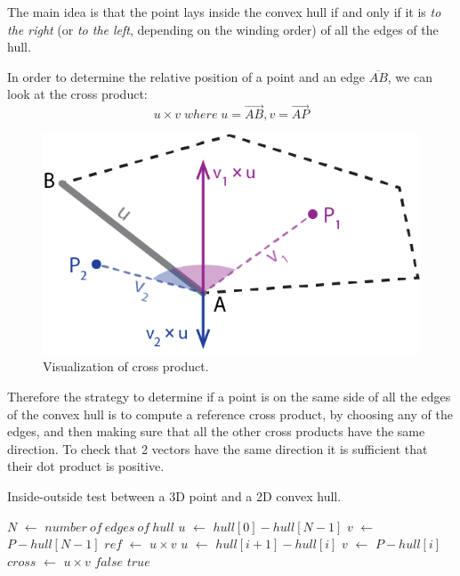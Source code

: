 \documentclass{PoliMi_MasterThesis}
\newcommand*\Let[2]{\State #1 $\gets$ #2}
\begin{document}
The main idea is that the point lays inside the convex hull if and only if it is \textit{to the right} (or \textit{to the left}, depending on the winding order) of all the edges of the hull.

In order to determine the relative position of a point and an edge $\overline{AB}$, we can look at the cross product:
$$u \times v \; where \; u = \overrightarrow{AB}, v = \overrightarrow{AP}$$

\begin{figure}[H]
    \centering
    \includegraphics[scale=0.4]{Images/cross_product.png} 
    \caption{Visualization of cross product.}
    \label{fig:cross_product}
\end{figure}

Therefore the strategy to determine if a point is on the same side of all the edges of the convex hull is to compute a reference cross product, by choosing any of the edges, and then making sure that all the other cross products have the same direction. To check that 2 vectors have the same direction it is sufficient that their dot product is positive.

\begin{algorithm}[H]
	\caption{Inside-outside test between a 3D point and a 2D convex hull.} 
	\begin{algorithmic}[1]
		\Let{$N$}{$number \: of \: edges \: of \: hull$}
		\Let{$u$}{$hull[0] - hull[N-1]$}
		\Let{$v$}{$P - hull[N-1]$}
		\Let{$ref$}{$u \times v$} 
			\Let{$u$}{$hull[i+1] - hull[i]$}
			\Let{$v$}{$P - hull[i]$}
			\Let{$cross$}{$u \times v$}
				\State \Return $false$
			\EndIf
		\EndFor
		\State \Return $true$
		\EndFunction
	\end{algorithmic}
\end{algorithm} 
\end{document}
